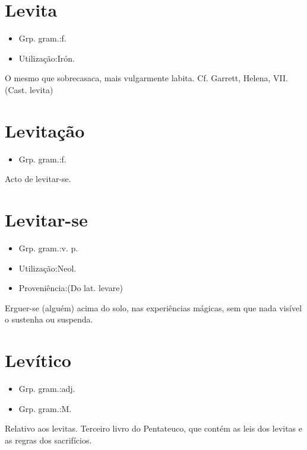 \section{Levita}
\begin{itemize}
\item {Grp. gram.:f.}
\end{itemize}
\begin{itemize}
\item {Utilização:Irón.}
\end{itemize}
O mesmo que \textunderscore sobrecasaca\textunderscore , mais vulgarmente \textunderscore labita\textunderscore . Cf. Garrett, \textunderscore Helena\textunderscore , VII.
(Cast. \textunderscore levita\textunderscore )
\section{Levitação}
\begin{itemize}
\item {Grp. gram.:f.}
\end{itemize}
Acto de levitar-se.
\section{Levitar-se}
\begin{itemize}
\item {Grp. gram.:v. p.}
\end{itemize}
\begin{itemize}
\item {Utilização:Neol.}
\end{itemize}
\begin{itemize}
\item {Proveniência:(Do lat. \textunderscore levare\textunderscore )}
\end{itemize}
Erguer-se (alguém) acima do solo, nas experiências mágicas, sem que nada visível o sustenha ou suspenda.
\section{Levítico}
\begin{itemize}
\item {Grp. gram.:adj.}
\end{itemize}
\begin{itemize}
\item {Grp. gram.:M.}
\end{itemize}
Relativo aos levitas.
Terceiro livro do \textunderscore Pentateuco\textunderscore , que contém as leis dos levitas e as regras dos sacrifícios.
